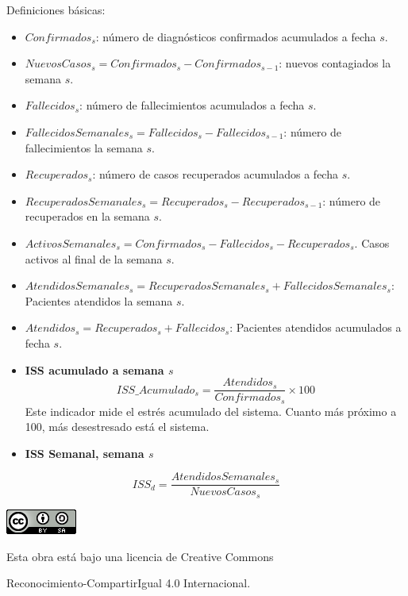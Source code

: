 \documentclass[
  11pt,
]{article}
\begin{document}
Definiciones básicas:

\begin{itemize}
\item
  \(Confirmados_s\): número de diagnósticos confirmados acumulados a
  fecha \(s\).
\item
  \(NuevosCasos_{s} = Confirmados_{s} - Confirmados_{s-1}\): nuevos
  contagiados la semana \(s\).
\item
  \(Fallecidos_s\): número de fallecimientos acumulados a fecha \(s\).
\item
  \(FallecidosSemanales_s = Fallecidos_{s} - Fallecidos_{s-1}\): número
  de fallecimientos la semana \(s\).
\item
  \(Recuperados_s\): número de casos recuperados acumulados a fecha
  \(s\).
\item
  \(RecuperadosSemanales_{s} = Recuperados_{s} - Recuperados_{s-1}\):
  número de recuperados en la semana \(s\).
\item
  \(ActivosSemanales_s = Confirmados_s - Fallecidos_s - Recuperados_s\).
  Casos activos al final de la semana \(s\).
\item
  \(AtendidosSemanales_{s} = RecuperadosSemanales_s + FallecidosSemanales_s\):
  Pacientes atendidos la semana \(s\).
\item
  \(Atendidos_{s} = Recuperados_s + Fallecidos_s\): Pacientes atendidos
  acumulados a fecha \(s\).
\item
  \textbf{ISS acumulado a semana \(s\)}
  \[ISS\_Acumulado_s = \frac{Atendidos_s}{Confirmados_s} \times 100\]
  Este indicador mide el estrés acumulado del sistema. Cuanto más
  próximo a 100, más desestresado está el sistema.
\item
  \textbf{ISS Semanal, semana \(s\)}
\end{itemize}

\[
ISS_d = \frac{AtendidosSemanales_s}{NuevosCasos_{s}}
\]

\vspace{4cm}

\begin{center}
\includegraphics{cc.png}
\end{center}

\vspace{0.2cm}

\begin{center}
Esta obra está bajo una licencia de Creative Commons 
\end{center}

\begin{center}
Reconocimiento-CompartirIgual 4.0 Internacional.
\end{center}
\end{document}
